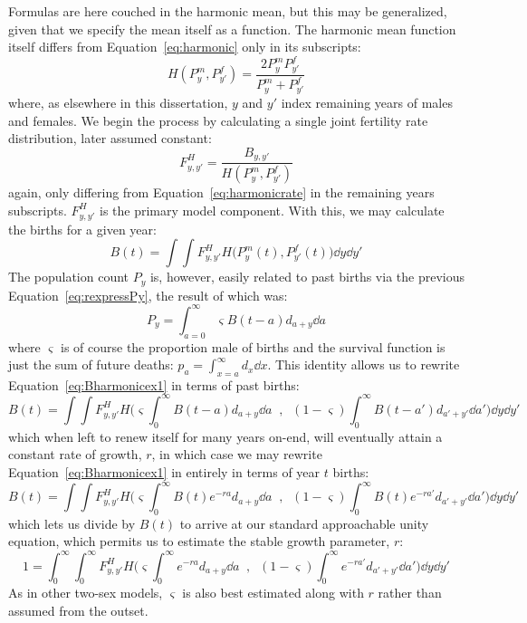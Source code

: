  \FloatBarrier
Formulas are here couched in the harmonic
mean, but this may be generalized, given that we specify the mean itself as
a function. The harmonic mean function itself differs from
Equation~\eqref{eq:harmonic} only in its subscripts:
\begin{equation}
H(P_y^m, P_{y'}^f) = \frac{2 P_y^m P_{y'}^f}{P_y^m + P_{y'}^f}
\end{equation}
where, as elsewhere in this dissertation, $y$ and $y'$ index remaining years of
males and females. We begin the process by calculating a single joint fertility rate distribution,
later assumed constant:
 \begin{equation}
 F_{y,y'}^H = \frac{B_{y,y'}}{H(P_y^m, P_{y'}^f)}
 \end{equation}
again, only differing from Equation~\eqref{eq:harmonicrate} in the remaining
years subscripts. $F_{y,y'}^H$ is the primary model component. With this, we may
calculate the births for a given year:
 \begin{equation}
 \label{eq:Bharmonicex1}
 B(t) = \int \int F_{y,y'}^H H\Big(P_{y}^m(t), P_{y'}^f(t)\Big) \dd y \dd
 y'
 \end{equation}
The population count $P_y$ is, however, easily related to past births via the
previous Equation~\eqref{eq:rexpressPy}, the result of which was:
\begin{equation}
P_y = \int_{a=0}^\infty \varsigma B(t-a)d_{a+y} \dd a
\end{equation}
 where $\varsigma$ is of course the proportion
male of births and the survival function is just the sum of future deaths: $p_a
= \int _{x=a}^\infty d_x \dd x$. This identity allows us to rewrite
Equation~\eqref{eq:Bharmonicex1} in terms of past births:
 \begin{equation}
 \label{eq:Bharmonicex1}
 B(t) = \int \int F_{y,y'}^H H\Bigg(\varsigma \int _0^\infty B(t-a)d_{a+y}\dd
 a\;\;,\;\; (1-\varsigma) \int _0^\infty B(t-a')d_{a'+y'} \dd a'\Bigg) \dd y \dd
 y'
 \end{equation}
which when left to renew itself for many years on-end, will eventually attain a
constant rate of growth, $r$, in which case we may rewrite
Equation~\eqref{eq:Bharmonicex1} in entirely in terms of year $t$ births:
 \begin{equation}
 \label{eq:Bharmonicex2}
 B(t) = \int \int F_{y,y'}^H H\Bigg(\varsigma \int _0^\infty
 B(t)e^{-ra}d_{a+y}\dd a\;\;,\;\; (1-\varsigma) \int _0^\infty
 B(t)e^{-ra'}d_{a'+y'} \dd a'\Bigg) \dd y \dd y'
 \end{equation}
which lets us divide by $B(t)$ to arrive at our standard approachable unity
equation, which permits us to estimate the stable growth parameter, $r$:
 \begin{equation}
 \label{eq:exMeanUnity}
 1 = \int_0^\infty \int_0^\infty F_{y,y'}^H H\Bigg(\varsigma \int _0^\infty
 e^{-ra}d_{a+y}\dd a\;\;,\;\; (1-\varsigma) \int _0^\infty
 e^{-ra'}d_{a'+y'} \dd a'\Bigg) \dd y \dd y'
 \end{equation}
As in other two-sex models, $\varsigma$ is also best estimated along with $r$
rather than assumed from the outset.
 \FloatBarrier
